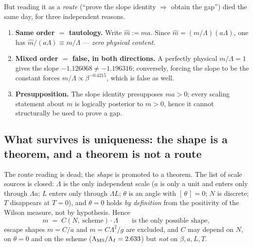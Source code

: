 But reading it as a \emph{route} (``prove the slope identity $\Rightarrow$ obtain the gap'') died the
same day, for three independent reasons. \LN
{}

\begin{enumerate}[label=(\Alph*)]
\item \textbf{Same order $=$ tautology.} Write $\hat m := m a$. Since
      $\hat m = (m/\Lambda)(a\Lambda)$, one has $\hat m/(a\Lambda) \equiv m/\Lambda$ ---
      \emph{zero physical content}. \LT
\item \textbf{Mixed order $=$ false, in both directions.} A perfectly physical $m/\Lambda = 1$ gives
      the slope $-1.126068 \neq -1.196316$; conversely, forcing the slope to be the constant forces
      $m/\Lambda \propto \beta^{-0.4215}$, which is false as well. \LT
\item \textbf{Presupposition.} The slope identity presupposes $ma>0$; every scaling statement about
      $m$ is logically posterior to $m>0$, hence it cannot structurally be used to prove a gap. \LN
\end{enumerate}

\subsection{What survives is uniqueness: the shape is a theorem, and a theorem is not a route}

The route reading is dead; the \emph{shape} is promoted to a theorem. The list of scale sources is
closed: $\Lambda$ is the only independent scale ($a$ is only a unit and enters only through
$\Lambda a$; $L$ enters only through $\Lambda L$; $\theta$ is an angle with $[\,\theta\,]=0$; $N$ is
discrete; $T$ disappears at $T=0$), and $\theta=0$ holds \emph{by definition} from the positivity of
the Wilson measure, not by hypothesis. Hence
\begin{equation}
  m \;=\; C(N,\ \text{scheme})\cdot\Lambda
  \qquad\text{is the only possible shape},
  \label{eq:unique}
\end{equation}
escape shapes $m=C/a$ and $m=C\Lambda^{2}/g$ are excluded, and $C$ may depend on $N$, on $\theta=0$
and on the scheme ($\Lambda_{\mathrm{MS}}/\Lambda_I = 2.633$) but \emph{not} on $\beta,a,L,T$. \LT
{}

